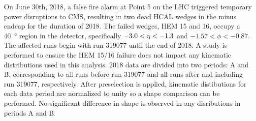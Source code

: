 On June 30th, 2018, a false fire alarm at Point 5 on the LHC triggered temporary power disruptions to CMS, resulting in two dead HCAL wedges in the minus endcap for the duration of 2018. The failed wedges, HEM 15 and 16, occupy a \SI{40}{\degree} region in the detector, specifically $-3.0 < \eta < -1.3$ and $-1.57 < \phi < -0.87$. The affected runs begin with run 319077 until the end of 2018. A study is performed to ensure the HEM 15/16 failure does not impact any kinematic distributions used in this analysis. 2018 data are divided into two periods: A and B, corresponding to all runs before run 319077 and all runs after and including run 319077, respectively. After preselection is applied, kinematic distibutions for each data period are normalized to unity so a shape comparison can be performed. No significant difference in shape is observed in any disributions in periods A and B.


